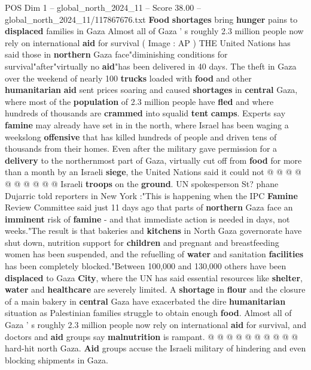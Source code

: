 \begin{textsample}{POS Dim 1 – global\_north\_2024\_11 – Score 38.00 – global\_north\_2024\_11/117867676.txt}  \label{ex:f1_pos_335}
\textbf{Food} \textbf{shortages} bring \textbf{hunger} pains to \textbf{displaced} families in Gaza Almost all of Gaza ' s roughly 2.3 million people now rely on international \textbf{aid} for survival ( Image : AP ) THE United Nations has said those in \textbf{northern} Gaza face"diminishing conditions for survival"after"virtually no \textbf{aid}"has been delivered in 40 days.
The theft in Gaza over the weekend of nearly 100 \textbf{trucks} loaded with \textbf{food} and other \textbf{humanitarian} \textbf{aid} sent prices soaring and caused \textbf{shortages} in \textbf{central} Gaza, where most of the \textbf{population} of 2.3 million people have \textbf{fled} and where hundreds of thousands are \textbf{crammed} into squalid \textbf{tent} \textbf{camps}.
Experts say \textbf{famine} may already have set in in the north, where Israel has been waging a weekslong \textbf{offensive} that has killed hundreds of people and driven tens of thousands from their homes.
Even after the military gave permission for a \textbf{delivery} to the northernmost part of Gaza, virtually cut off from \textbf{food} for more than a month by an Israeli \textbf{siege}, the United Nations said it could not @ @ @ @ @ @ @ @ @ @ Israeli \textbf{troops} on the \textbf{ground}.
UN spokesperson St? phane Dujarric told reporters in New York :"This is happening when the IPC \textbf{Famine} Review Committee said just 11 days ago that parts of \textbf{northern} Gaza face an \textbf{imminent} risk of \textbf{famine} - and that immediate action is needed in days, not weeks."The result is that bakeries and \textbf{kitchens} in North Gaza governorate have shut down, nutrition support for \textbf{children} and pregnant and breastfeeding women has been suspended, and the refuelling of \textbf{water} and sanitation \textbf{facilities} has been completely blocked."Between 100,000 and 130,000 others have been \textbf{displaced} to Gaza \textbf{City}, where the UN has said essential resources like \textbf{shelter}, \textbf{water} and \textbf{healthcare} are severely limited.
A \textbf{shortage} in \textbf{flour} and the closure of a main bakery in \textbf{central} Gaza have exacerbated the dire \textbf{humanitarian} situation as Palestinian families struggle to obtain enough \textbf{food}.
Almost all of Gaza ' s roughly 2.3 million people now rely on international \textbf{aid} for survival, and doctors and \textbf{aid} groups say \textbf{malnutrition} is rampant. @ @ @ @ @ @ @ @ @ @ hard-hit north Gaza. \textbf{Aid} groups accuse the Israeli military of hindering and even blocking shipments in Gaza.

\end{textsample}
